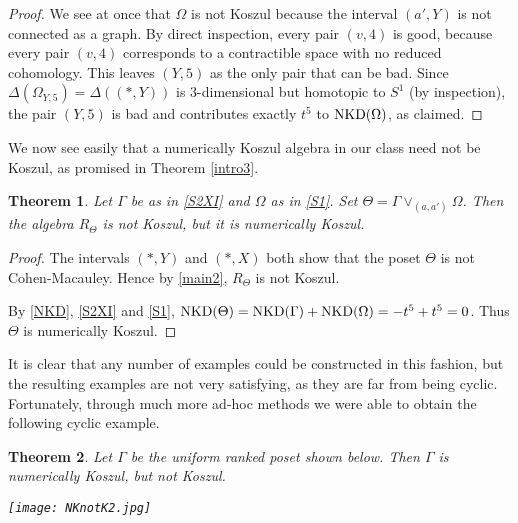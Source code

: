 \documentclass[11pt,righttag]{amsart}
\newtheorem{thm}{Theorem}[section]
\theoremstyle{definition}
\begin{document}
\begin{proof}  We see at once that $\Omega$ is not Koszul because the interval $(a',Y)$ is not connected as a graph.  By 
direct inspection, every pair $(v,4)$ is good, because every pair $(v,4)$ corresponds to a contractible space with no 
reduced cohomology. This leaves $(Y,5)$ as the only pair that can be bad.   Since $\Delta(\Omega_{Y,5}) = \Delta((*,Y))$ is 3-dimensional but homotopic to $S^1$ (by inspection), the pair $(Y,5)$ is bad and contributes exactly $t^5$ to ${{\rm NKD}}(\Omega)$, as claimed. 
 \end{proof} 
 
We now see easily that a numerically Koszul algebra in our class need not be Koszul, as promised in Theorem \ref{intro3}. 

\begin{thm}\label{main3}  Let $\Gamma$ be as in \ref{S2XI} and $\Omega$ as in \ref{S1}.  Set $\Theta = \Gamma \vee_{(a,a')}\Omega$.  Then the algebra $R_\Theta$ is not Koszul, but it is numerically Koszul.
\end{thm}

\begin{proof}
The intervals $(*,Y)$ and $(*,X)$ both show that the poset $\Theta$ is not Cohen-Macauley.  Hence by \ref{main2}, $R_\Theta$ is not Koszul.

By \ref{NKD}, \ref{S2XI} and \ref{S1}, ${{\rm NKD}}(\Theta) = {{\rm NKD}}(\Gamma) + {{\rm NKD}}(\Omega) = -t^5 + t^5 = 0$.  Thus $\Theta$ is numerically Koszul. 
\end{proof}

It is clear that any number of examples could be constructed in this fashion, but the resulting examples are not very satisfying, as they are far from being cyclic.  Fortunately, through much more ad-hoc methods we were able to obtain the following cyclic example.

\begin{thm}\label{wild}
Let $\Gamma$ be the uniform ranked poset shown below.  Then $\Gamma$ is numerically Koszul, but not Koszul.
\begin{center}
\texttt{[image: NKnotK2.jpg]}
\end{center}
\end{thm}
\end{document}
